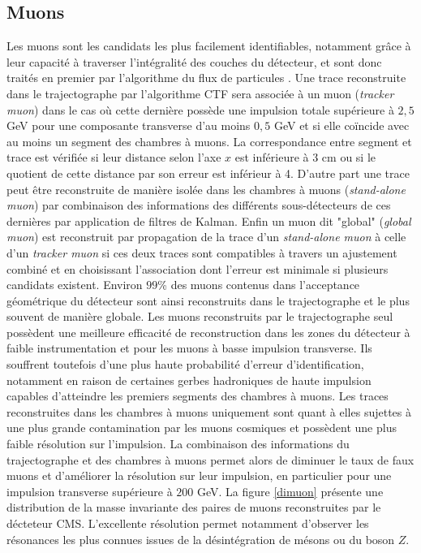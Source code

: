 \subsection{Muons}
\label{MuonID}

Les muons sont les candidats les plus facilement identifiables, notamment grâce à leur capacité à traverser l'intégralité des couches du détecteur, et sont donc traités en premier par l'algorithme du flux de particules \cite{Sirunyan:2313130}. Une trace reconstruite dans le trajectographe par l'algorithme CTF sera associée à un muon (\textit{tracker muon}) dans le cas où cette dernière possède une impulsion totale supérieure à $2,5$ GeV pour une composante transverse d'au moins $0,5$ GeV et si elle coïncide avec au moins un segment des chambres à muons. La correspondance entre segment et trace est vérifiée si leur distance selon l'axe $x$ est inférieure à $3$ cm ou si le quotient de cette distance par son erreur est inférieur à 4. D'autre part une trace peut être reconstruite de manière isolée dans les chambres à muons (\textit{stand-alone muon}) par combinaison des informations des différents sous-détecteurs de ces dernières par application de filtres de Kalman. Enfin un muon dit "global" (\textit{global muon}) est reconstruit par propagation de la trace d'un \textit{stand-alone muon} à celle d'un \textit{tracker muon} si ces deux traces sont compatibles à travers un ajustement combiné et en choisissant l'association dont l'erreur est minimale si plusieurs candidats existent. Environ $99$\% des muons contenus dans l'acceptance géométrique du détecteur sont ainsi reconstruits dans le trajectographe et le plus souvent de manière globale. Les muons reconstruits par le trajectographe seul possèdent une meilleure efficacité de reconstruction dans les zones du détecteur à faible instrumentation et pour les muons à basse impulsion transverse. Ils souffrent toutefois d'une plus haute probabilité d'erreur d'identification, notamment en raison de certaines gerbes hadroniques de haute impulsion capables d'atteindre les premiers segments des chambres à muons. Les traces reconstruites dans les chambres à muons uniquement sont quant à elles sujettes à une plus grande contamination par les muons cosmiques et possèdent une plus faible résolution sur l'impulsion. La combinaison des informations du trajectographe et des chambres à muons permet alors de diminuer le taux de faux muons et d'améliorer la résolution sur leur impulsion, en particulier pour une impulsion transverse supérieure à $200$ GeV. La figure \ref{dimuon} présente une distribution de la masse invariante des paires de muons reconstruites par le décteteur CMS. L'excellente résolution permet notamment d'observer les résonances les plus connues issues de la désintégration de mésons ou du boson $Z$. \\

